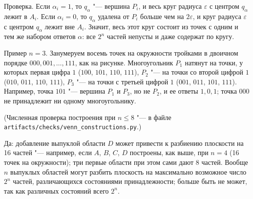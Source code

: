 \begin{solution}[2 (\S\,2)]
Проверка. Если $\alpha_i=1$, то $q_\alpha$ "--- вершина $P_i$, и весь круг
радиуса $\varepsilon$ с центром $q_\alpha$ лежит в $A_i$. Если $\alpha_i=0$,
то $q_\alpha$ удалена от $P_i$ больше чем на $2\varepsilon$, и круг радиуса
$\varepsilon$ с центром $q_\alpha$ лежит вне $A_i$. Значит, весь этот круг
состоит из точек с одним и тем же набором ответов $\alpha$: все $2^n$
частей непусты и даже содержат по кругу.

Пример $n=3$. Занумеруем восемь точек на окружности тройками в двоичном
порядке $000,001,\dots,111$, как на рисунке. Многоугольник $P_1$ натянут на
точки, у которых первая цифра $1$ ($100$, $101$, $110$, $111$), $P_2$ "---
на точки со второй цифрой $1$ ($010$, $011$, $110$, $111$), $P_3$ "--- на
точки с третьей цифрой $1$ ($001$, $011$, $101$, $111$). Например, точка
$101$ "--- вершина $P_1$ и $P_3$, но не $P_2$, и ее ответы $1,0,1$; точка
$000$ не принадлежит ни одному многоугольнику.
\begin{center}
\par{}
\end{center}
(Численная проверка построения при $n\le8$ "--- в файле
\texttt{artifacts/checks/venn\_constructions.py}.)

\answer Да: добавление выпуклой области $D$ может привести к разбиению
плоскости на 16 частей "--- например, если $A$, $B$, $C$, $D$ построены, как
выше, при $n=4$ (16 точек на окружности); три первые области при этом сами
дают 8 частей. Вообще $n$ выпуклых областей могут разбить плоскость на
максимально возможное число $2^n$ частей, различающихся состояниями
принадлежности; больше быть не может, так как различных состояний всего
$2^n$.
\end{solution}

